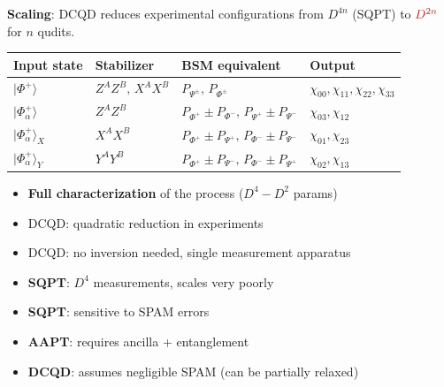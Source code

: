 \documentclass[10pt,a4paper]{article}
\begin{document}
\textbf{Scaling}: DCQD reduces experimental configurations from $D^{4n}$ (SQPT) to $\textcolor{alertred}{D^{2n}}$ for $n$ qudits.

\begin{keybox}
\centering\small
\begin{tabular}{llll}
\toprule
\textbf{Input state} & \textbf{Stabilizer} & \textbf{BSM equivalent} & \textbf{Output} \\
\midrule
$|\Phi^+\rangle$ & $Z^AZ^B,\, X^AX^B$ & $P_{\Psi^\pm},\, P_{\Phi^\pm}$ & $\chi_{00},\chi_{11},\chi_{22},\chi_{33}$ \\
$|\Phi^+_\alpha\rangle$ & $Z^AZ^B$ & $P_{\Phi^+}\pm P_{\Phi^-},\, P_{\Psi^+}\pm P_{\Psi^-}$ & $\chi_{03},\chi_{12}$ \\
$|\Phi^+_\alpha\rangle_X$ & $X^AX^B$ & $P_{\Phi^+}\pm P_{\Psi^+},\, P_{\Phi^-}\pm P_{\Psi^-}$ & $\chi_{01},\chi_{23}$ \\
$|\Phi^+_\alpha\rangle_Y$ & $Y^AY^B$ & $P_{\Phi^+}\pm P_{\Psi^-},\, P_{\Phi^-}\pm P_{\Psi^+}$ & $\chi_{02},\chi_{13}$ \\
\bottomrule
\end{tabular}
\end{keybox}

\begin{minipage}[t]{0.48\textwidth}
\begin{prosbox}
\begin{itemize}
  \item \textbf{Full characterization} of the process ($D^4 - D^2$ params)
  \item DCQD: quadratic reduction in experiments
  \item DCQD: no inversion needed, single measurement apparatus
\end{itemize}
\end{prosbox}
\end{minipage}
\hfill
\begin{minipage}[t]{0.48\textwidth}
\begin{consbox}
\begin{itemize}
  \item \textbf{SQPT}: $D^4$ measurements, scales very poorly
  \item \textbf{SQPT}: sensitive to SPAM errors
  \item \textbf{AAPT}: requires ancilla + entanglement
  \item \textbf{DCQD}: assumes negligible SPAM (can be partially relaxed)
\end{itemize}
\end{consbox}
\end{minipage}
\end{document}
